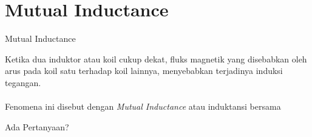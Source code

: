 \documentclass[10pt]{beamer}
\begin{document}
\section{Mutual Inductance}

\begin{frame}{Mutual Inductance}
    
    Ketika dua induktor atau koil cukup dekat, fluks magnetik yang disebabkan oleh arus pada koil satu terhadap koil lainnya, menyebabkan terjadinya induksi tegangan. \\~\\
    Fenomena ini disebut dengan \emph{Mutual Inductance} atau induktansi bersama
\end{frame}


\begin{frame}[standout]
    Ada Pertanyaan?
\end{frame}
  
\appendix
  
\end{document}
